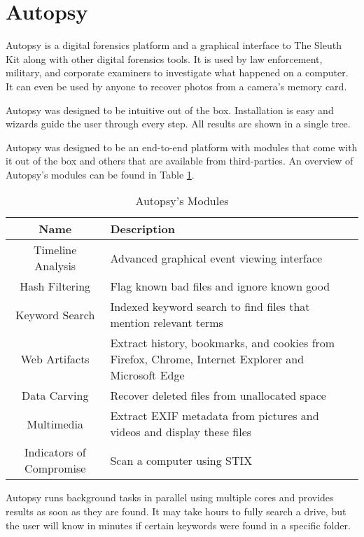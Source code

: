 \section{Autopsy}

Autopsy is a digital forensics platform and a graphical interface to The Sleuth Kit
along with other digital forensics tools. It is used by law enforcement, military, 
and corporate examiners to investigate what happened on a computer. It can even 
be used by anyone to recover photos from a camera's memory card.

Autopsy was designed to be intuitive out of the box. Installation is easy and
wizards guide the user through every step. All results are shown in a single tree.

Autopsy was designed to be an end-to-end platform with modules that come with
it out of the box and others that are available from third-parties. An overview of Autopsy's modules can be found in Table \ref{tab:autopsyModules}.

\begin{table}[h]
  \begin{tabularx}{\textwidth}{@{}|c| *1{>{\centering\arraybackslash}X}@{}|}
    \hline
    \textbf{Name} & \textbf{Description} \\
    \hline\hline
    Timeline Analysis & Advanced graphical event viewing interface \\
    \hline
    Hash Filtering & Flag known bad files and ignore known good \\
    \hline
    Keyword Search & Indexed keyword search to find files that mention relevant terms \\
    \hline
    Web Artifacts & Extract history, bookmarks, and cookies from Firefox, Chrome, Internet Explorer and Microsoft Edge \\
    \hline
    Data Carving & Recover deleted files from unallocated space \\
    \hline
    Multimedia & Extract EXIF metadata from pictures and videos and display these files \\
    \hline
    Indicators of Compromise & Scan a computer using STIX \\
    \hline
  \end{tabularx}
    \caption{Autopsy's Modules}
  \label{tab:autopsyModules}
\end{table}

Autopsy runs background tasks in parallel using multiple cores and provides results as soon as they are found.
It may take hours to fully search a drive, but the user will know in minutes if certain keywords were found in a specific folder.


